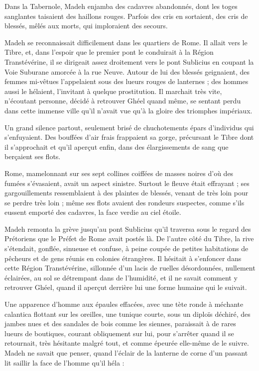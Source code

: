 \documentclass[a4paper, 11pt, oneside, polutonikogreek, french]{article}
\begin{document}
Dans la Tabernole, Madeh enjamba des cadavres abandonnés, dont les toges sanglantes taisaient des haillons rouges. Parfois des cris en sortaient, des cris de blessés, mêlés aux morts, qui imploraient des secours.

Madeh se reconnaissait difficilement dans les quartiers de Rome. Il allait vers le Tibre, et, dans l'espoir que le premier pont le conduirait à la Région Transtévérine, il se dirigeait assez droitement vers le pont Sublicius en coupant la Voie Suburane amorcée à la rue Neuve. Autour de lui des blessés geignaient, des femmes mi-vêtues l'appelaient sous des lueurs rouges de lanternes ; des hommes aussi le hélaient, l'invitant à quelque prostitution. Il marchait très vite, n'écoutant personne, décidé à retrouver Ghéel quand même, se sentant perdu dans cette immense ville qu'il n'avait vue qu'à la gloire des triomphes impériaux.

Un grand silence partout, seulement brisé de chuchotements épars d'individus qui s'enfuyaient. Des bouffées d'air frais frappaient sa gorge, précursant le Tibre dont il s'approchait et qu'il aperçut enfin, dans des élargissements de sang que berçaient ses flots.

Rome, mamelonnant sur ses sept collines coiffées de masses noires d'où des fumées s'évasaient, avait un aspect sinistre. Surtout le fleuve était effrayant ; ses gargouillements ressemblaient à des plaintes de blessés, venant de très loin pour se perdre très loin ; même ses flots avaient des rondeurs suspectes, comme s'ils eussent emporté des cadavres, la face verdie au ciel étoile.

Madeh remonta la grève jusqu'au pont Sublicius qu'il traversa sous le regard des Prétoriens que le Préfet de Rome avait postés là. De l'autre côté du Tibre, la rive s'étendait, gonflée, sinueuse et confuse, à peine coupée de petites habitations de pêcheurs et de gens réunis en colonies étrangères. Il hésitait à s'enfoncer dans cette Région Transtévérine, sillonnée d'un lacis de ruelles désordonnées, nullement éclairées, au sol se détrempant dans de l'humidité, et il ne savait comment y retrouver Ghéel, quand il aperçut derrière lui une forme humaine qui le suivait.

Une apparence d'homme aux épaules effacées, avec une tète ronde à méchante calantica flottant sur les oreilles, une tunique courte, sous un diploïs déchiré, des jambes nues et des sandales de bois comme les siennes, paraissait à de rares lueurs de boutiques, courant obliquement sur lui, pour s'arrêter quand il se retournait, très hésitante malgré tout, et comme épeurée elle-même de le suivre. Madeh ne savait que penser, quand l'éclair de la lanterne de corne d'un passant lit saillir la face de l'homme qu'il héla :
\end{document}
